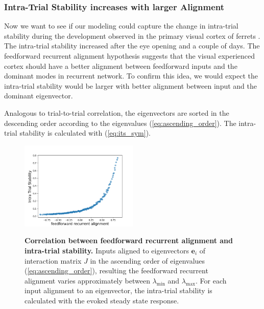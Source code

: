 \documentclass[11pt]{article}
\begin{document}
	
	\subsubsection{Intra-Trial Stability increases with larger Alignment}
	
	Now we want to see if our modeling could capture the change in intra-trial stability during the development observed in the primary visual cortex of ferrets \cite{tragenap2023nature}. The intra-trial stability increased after the eye opening and a couple of days. The feedforward recurrent alignment hypothesis suggests that the visual experienced cortex should have a better alignment between feedforward inputs and the dominant modes in recurrent network. To confirm this idea, we would expect the intra-trial stability would be larger with better alignment between input and the dominant eigenvector. 
	
	Analogous to trial-to-trial correlation, the eigenvectors are sorted in the descending order according to the eigenvalues (\ref{eq:ascending_order}). The intra-trial stability is calculated with (\ref{eq:its_sym}).
	\vspace{-0.4cm}
	\begin{figure} 
		\centering
		\caption{\textbf{Correlation between feedforward recurrent alignment and intra-trial stability.} Inputs aligned to eigenvectors $\mathbf{e}_i$ of interaction matrix $J$ in the ascending order of eigenvalues (\ref{eq:ascending_order}), resulting the feedforward recurrent alignment varies approximately between $\lambda_{\text{min}}$ and $\lambda_{\text{max}}$. For each input alignment to an eigenvector, the intra-trial stability is calculated with the evoked steady state response.}
		\includegraphics[width=0.5\textwidth]{../figures/its_sym.png}
		\label{fig:its_ffrec_sym}
	\end{figure}
\end{document}
